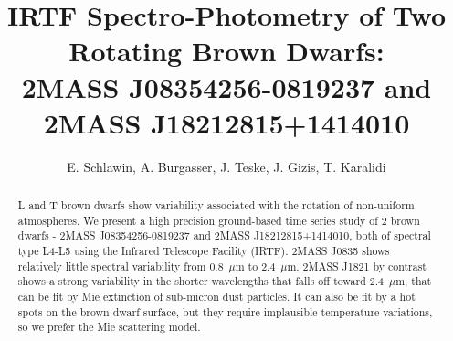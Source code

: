 \documentclass[twocolumn]{aastex6}
\begin{document}

\title{IRTF Spectro-Photometry of Two Rotating Brown Dwarfs: \\2MASS J08354256-0819237 and 2MASS J18212815+1414010}


\author{E. Schlawin, A. Burgasser, J. Teske, J. Gizis, T. Karalidi }






\begin{abstract}
L and T brown dwarfs show variability associated with the rotation of non-uniform atmospheres. We present a high precision ground-based time series study of 2 brown dwarfs - 2MASS J08354256-0819237 and 2MASS J18212815+1414010, both of spectral type L4-L5 using the Infrared Telescope Facility (IRTF). 2MASS J0835 shows relatively little spectral variability from 0.8~$\mu$m to 2.4~$\mu$m. 2MASS J1821 by contrast shows a strong variability in the shorter wavelengths that falls off toward 2.4~$\mu$m, that can be fit by Mie extinction of sub-micron dust particles. It can also be fit by a hot spots on the brown dwarf surface, but they require implausible temperature variations, so we prefer the Mie scattering model.
\end{abstract}
\end{document}
